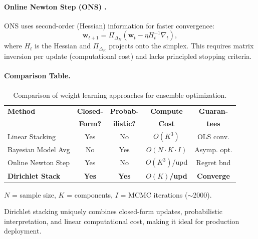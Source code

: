 \paragraph{Online Newton Step (ONS) \citep{hazan2007}.}
ONS uses second-order (Hessian) information for faster convergence:
\begin{equation}
\mathbf{w}_{t+1} = \Pi_{\Delta_K}\left(\mathbf{w}_t - \eta H_t^{-1} \nabla_t\right),
\end{equation}
where $H_t$ is the Hessian and $\Pi_{\Delta_K}$ projects onto the simplex. This requires matrix inversion per update (computational cost) and lacks principled stopping criteria.

\paragraph{Comparison Table.}
\begin{table}[h]
\centering
\small
\caption[Comparison of ensemble weight learning methods]{Comparison of weight learning approaches for ensemble optimization.}
\label{tab:weight-learning-comparison}
\begin{threeparttable}
\begin{tabular}{@{}lcccc@{}}
\toprule
\textbf{Method} & \textbf{Closed-} & \textbf{Probab-} & \textbf{Compute} & \textbf{Guaran-} \\
 & \textbf{Form?} & \textbf{ilistic?} & \textbf{Cost} & \textbf{tees} \\
\midrule
Linear Stacking & Yes & No & $O(K^3)$ & OLS conv. \\
Bayesian Model Avg & No & Yes & $O(N \cdot K \cdot I)$\tnote{a} & Asymp. opt. \\
Online Newton Step & Yes & No & $O(K^3)$/upd & Regret bnd \\
\textbf{Dirichlet Stack} & \textbf{Yes} & \textbf{Yes} & \textbf{$O(K)$/upd} & \textbf{Converge} \\
\bottomrule
\end{tabular}
\begin{tablenotes}
\footnotesize
\item[a] $N$ = sample size, $K$ = components, $I$ = MCMC iterations ($\sim$2000).
\end{tablenotes}
\end{threeparttable}
\end{table}

Dirichlet stacking uniquely combines closed-form updates, probabilistic interpretation, and linear computational cost, making it ideal for production deployment.

